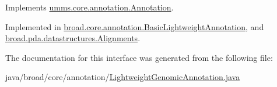 Implements \hyperlink{interfaceumms_1_1core_1_1annotation_1_1_annotation_a6be4427ca02f0d1f6cfeb9481ba09e0f}{umms.\+core.\+annotation.\+Annotation}.



Implemented in \hyperlink{classbroad_1_1core_1_1annotation_1_1_basic_lightweight_annotation_a82903ca4b9f07f9b7bcafe7ef43afd82}{broad.\+core.\+annotation.\+Basic\+Lightweight\+Annotation}, and \hyperlink{classbroad_1_1pda_1_1datastructures_1_1_alignments_afc4c11e6eb0231559d46afc7a61fa6da}{broad.\+pda.\+datastructures.\+Alignments}.



The documentation for this interface was generated from the following file\+:\begin{DoxyCompactItemize}
\item 
java/broad/core/annotation/\hyperlink{_lightweight_genomic_annotation_8java}{Lightweight\+Genomic\+Annotation.\+java}\end{DoxyCompactItemize}
